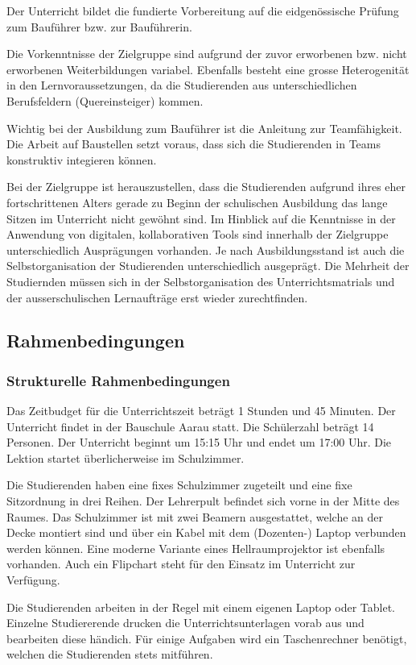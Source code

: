 \documentclass[
11pt,
captions=tableheading,
smallheadings,
headsepline,
footsepline, 
captions=tableheading,
parskip=half-,
]{scrartcl}
\begin{document}
Der Unterricht bildet die fundierte Vorbereitung auf die eidgenössische Prüfung zum Bauführer bzw. zur Bauführerin.


Die Vorkenntnisse der Zielgruppe sind aufgrund der zuvor erworbenen bzw. nicht erworbenen Weiterbildungen variabel.
Ebenfalls besteht eine grosse Heterogenität in den Lernvoraussetzungen, da die Studierenden aus unterschiedlichen Berufsfeldern (Quereinsteiger) kommen.

Wichtig bei der Ausbildung zum Bauführer ist die Anleitung zur Teamfähigkeit. Die Arbeit auf Baustellen setzt voraus, dass sich die Studierenden in Teams konstruktiv integieren können.

Bei der Zielgruppe ist herauszustellen, dass die Studierenden aufgrund ihres eher fortschrittenen Alters gerade zu Beginn der schulischen Ausbildung das lange Sitzen im Unterricht nicht gewöhnt sind.
Im Hinblick auf die Kenntnisse in der Anwendung von digitalen, kollaborativen Tools sind innerhalb der Zielgruppe unterschiedlich Ausprägungen vorhanden.
Je nach Ausbildungsstand ist auch die Selbstorganisation der Studierenden unterschiedlich ausgeprägt.
Die Mehrheit der Studiernden müssen sich in der Selbstorganisation des Unterrichtsmatrials und der ausserschulischen Lernaufträge erst wieder zurechtfinden.

\subsection{Rahmenbedingungen}
\subsubsection{Strukturelle Rahmenbedingungen}
Das Zeitbudget für die Unterrichtszeit beträgt 1 Stunden und 45 Minuten.
Der Unterricht findet in der Bauschule Aarau statt. Die Schülerzahl beträgt 14 Personen.
Der Unterricht beginnt um 15:15 Uhr und endet um 17:00 Uhr.
Die Lektion startet überlicherweise im Schulzimmer.

Die Studierenden haben eine fixes Schulzimmer zugeteilt und eine fixe Sitzordnung in drei Reihen.
Der Lehrerpult befindet sich vorne in der Mitte des Raumes.
Das Schulzimmer ist mit zwei Beamern ausgestattet, welche an der Decke montiert sind und über ein Kabel mit dem (Dozenten-) Laptop verbunden werden können.
Eine moderne Variante eines  Hellraumprojektor ist ebenfalls vorhanden. Auch ein Flipchart steht für den Einsatz im Unterricht zur Verfügung.


Die Studierenden arbeiten in der Regel mit einem eigenen Laptop oder Tablet. Einzelne Studiererende drucken die Unterrichtsunterlagen vorab aus und bearbeiten diese händich.
    Für einige Aufgaben wird ein Taschenrechner benötigt, welchen die Studierenden stets mitführen.
\end{document}
